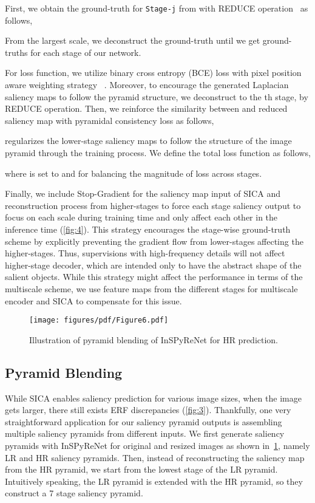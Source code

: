 \documentclass{llncs}
\begin{document}
        First, we obtain the ground-truth  for \texttt{Stage-j} from  with REDUCE operation~\cite{burt1983laplacian} as follows,
        
        From the largest scale, we deconstruct the ground-truth until we get ground-truths for each stage of our network. 
        
        For loss function, we utilize binary cross entropy (BCE) loss with pixel position aware weighting strategy ~\cite{wei2020f3net}.
        Moreover, to encourage the generated Laplacian saliency maps to follow the pyramid structure, we deconstruct  to the th stage,  by REDUCE operation. Then, we reinforce the similarity between  and reduced saliency map  with pyramidal consistency loss  as follows,
        
         regularizes the lower-stage saliency maps to follow the structure of the image pyramid through the training process. 
        We define the total loss function  as follows,
        
        where  is set to  and  for balancing the magnitude of loss across stages.
        
        Finally, we include Stop-Gradient for the saliency map input of SICA and reconstruction process from higher-stages to force each stage saliency output to focus on each scale during training time and only affect each other in the inference time (\cref{fig:4}).
        This strategy encourages the stage-wise ground-truth scheme by explicitly preventing the gradient flow from lower-stages affecting the higher-stages. 
        Thus, supervisions with high-frequency details will not affect higher-stage decoder, which are intended only to have the abstract shape of the salient objects. 
        While this strategy might affect the performance in terms of the multiscale scheme, we use feature maps from the different stages for multiscale encoder and SICA to compensate for this issue.
        
        \begin{figure}
    \centering
    \texttt{[image: figures/pdf/Figure6.pdf]}
    \caption{Illustration of pyramid blending of InSPyReNet for HR prediction.}
    \label{fig:6}
\end{figure}         
        \subsection{Pyramid Blending}
        \label{sec:met.5}
        While SICA enables saliency prediction for various image sizes, when the image gets larger, there still exists ERF discrepancies (\cref{fig:3}).
        Thankfully, one very straightforward application for our saliency pyramid outputs is assembling multiple saliency pyramids from different inputs.
        We first generate saliency pyramids with InSPyReNet for original and resized images as shown in~\cref{fig:6}, namely LR and HR saliency pyramids.
        Then, instead of reconstructing the saliency map from the HR pyramid, we start from the lowest stage of the LR pyramid.
        Intuitively speaking, the LR pyramid is extended with the HR pyramid, so they construct a 7 stage saliency pyramid. 
        
\end{document}

